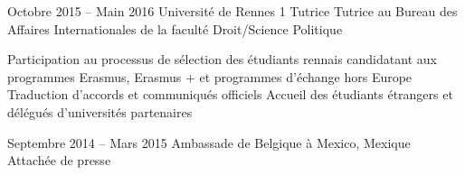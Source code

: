 \documentclass[30pt, french]{tccv}
\begin{document}
\begin{upshape}
\begin{competence}
\fontsize{10pt}{1.1em}\color{text}\bodyfontlight\upshape\selectfont %






\end{competence}




%
%


\begin{experience}

\vspace{0.5cm}
\item{\color{text} Octobre 2015 -- Main 2016}
     {Université de Rennes 1}
     {Tutrice}
     \fontsize{10pt}{1.1em}\color{text}\bodyfontlight\upshape\selectfont
{} Tutrice au Bureau des Affaires Internationales de la faculté Droit/Science Politique \\
\sloppy
{}%
    \setlength{\parskip}{-10pt}
    \begin{itemize}
      \cvitem[\checkmark] Participation au processus de sélection des étudiants rennais candidatant aux programmes Erasmus, Erasmus + et pro\-grammes d’échange hors Europe
      \cvitem[\checkmark] Traduction d’accords et communiqués officiels
      \cvitem[\checkmark] Accueil des étudiants étrangers et délégués d’uni\-ver\-sités par\-tenaires
    \end{itemize}     


\vspace{0.5cm}
\item{Septembre 2014 -- Mars 2015}
     {Ambassade de Belgique à Mexico, Mexique}
     {Attachée de presse}
     \fontsize{10pt}{1.1em}\color{text}\bodyfontlight\upshape\selectfont


\end{experience}
\end{upshape}
\end{document}
